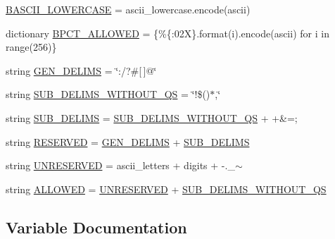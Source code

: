 \begin{DoxyCompactItemize}
\item 
\hyperlink{namespaceyarl_1_1quoting_a2a9c87e62cd6d2783f78039779b7c924}{B\+A\+S\+C\+I\+I\+\_\+\+L\+O\+W\+E\+R\+C\+A\+SE} = ascii\+\_\+lowercase.\+encode(\textquotesingle{}ascii\textquotesingle{})
\item 
dictionary \hyperlink{namespaceyarl_1_1quoting_a3f2e5f5c93259ca65a01c095bddf8094}{B\+P\+C\+T\+\_\+\+A\+L\+L\+O\+W\+ED} = \{\textquotesingle{}\%\{\+:02\+X\}\textquotesingle{}.\+format(i).\+encode(\textquotesingle{}ascii\textquotesingle{}) for i in range(256)\}
\item 
string \hyperlink{namespaceyarl_1_1quoting_aae6bf93619d18683b1a740650d34c284}{G\+E\+N\+\_\+\+D\+E\+L\+I\+MS} = \char`\"{}\+:/?\#\mbox{[}$\,$\mbox{]}@\char`\"{}
\item 
string \hyperlink{namespaceyarl_1_1quoting_a76fe1cdaed7ea153eb054dc7d2350af7}{S\+U\+B\+\_\+\+D\+E\+L\+I\+M\+S\+\_\+\+W\+I\+T\+H\+O\+U\+T\+\_\+\+QS} = \char`\"{}!\$\textquotesingle{}()$\ast$,\char`\"{}
\item 
string \hyperlink{namespaceyarl_1_1quoting_abe846c3500186a544982bffd03f52ded}{S\+U\+B\+\_\+\+D\+E\+L\+I\+MS} = \hyperlink{namespaceyarl_1_1quoting_a76fe1cdaed7ea153eb054dc7d2350af7}{S\+U\+B\+\_\+\+D\+E\+L\+I\+M\+S\+\_\+\+W\+I\+T\+H\+O\+U\+T\+\_\+\+QS} + \textquotesingle{}+\&=;\textquotesingle{}
\item 
string \hyperlink{namespaceyarl_1_1quoting_aec3e1fd6ac3a7de7a247641a19489ca3}{R\+E\+S\+E\+R\+V\+ED} = \hyperlink{namespaceyarl_1_1quoting_aae6bf93619d18683b1a740650d34c284}{G\+E\+N\+\_\+\+D\+E\+L\+I\+MS} + \hyperlink{namespaceyarl_1_1quoting_abe846c3500186a544982bffd03f52ded}{S\+U\+B\+\_\+\+D\+E\+L\+I\+MS}
\item 
string \hyperlink{namespaceyarl_1_1quoting_a8ed844e87b68a92403caedf1935b3461}{U\+N\+R\+E\+S\+E\+R\+V\+ED} = ascii\+\_\+letters + digits + \textquotesingle{}-\/.\+\_\+$\sim$\textquotesingle{}
\item 
string \hyperlink{namespaceyarl_1_1quoting_a79e93bb26561dc200fb9460608281b95}{A\+L\+L\+O\+W\+ED} = \hyperlink{namespaceyarl_1_1quoting_a8ed844e87b68a92403caedf1935b3461}{U\+N\+R\+E\+S\+E\+R\+V\+ED} + \hyperlink{namespaceyarl_1_1quoting_a76fe1cdaed7ea153eb054dc7d2350af7}{S\+U\+B\+\_\+\+D\+E\+L\+I\+M\+S\+\_\+\+W\+I\+T\+H\+O\+U\+T\+\_\+\+QS}
\end{DoxyCompactItemize}


\subsection{Variable Documentation}
\mbox{\label{namespaceyarl_1_1quoting_a79e93bb26561dc200fb9460608281b95}} 
